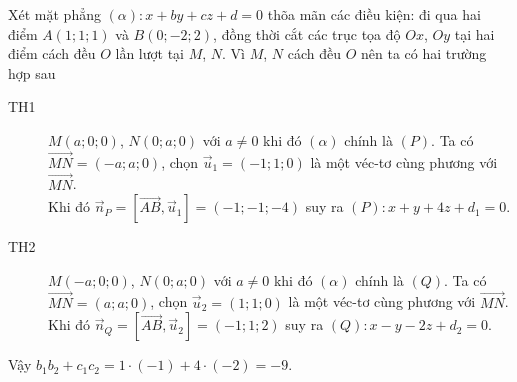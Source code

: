 \begin{ex}
{		Xét mặt phẳng $\left(\alpha\right) \colon x+by+cz+d=0$ thõa mãn các điều kiện: đi qua hai điểm $A \left(1;1;1\right)$ và $B\left(0;-2;2\right)$, đồng thời cắt các trục tọa độ $Ox$, $Oy$ tại hai điểm cách đều $O$ lần lượt tại $M$, $N$. Vì $M$, $N$ cách đều $O$ nên ta có hai trường hợp sau
		\begin{description}
			\item[TH1] $M \left(a;0;0\right)$, $N \left(0;a;0\right)$ với $a \neq 0$ khi đó $\left(\alpha\right)$ chính là $\left(P\right)$. Ta có $\overrightarrow{MN} = \left(-a;a;0\right)$, chọn $\overrightarrow{u}_1 = \left(-1;1;0\right)$ là một véc-tơ cùng phương với $\overrightarrow{MN}$.\\
			Khi đó $\overrightarrow{n}_P = \left[\overrightarrow{AB},\overrightarrow{u}_1\right] = \left(-1;-1;-4\right)$
			suy ra $\left(P\right) \colon x+y+4z+d_1 = 0$.
			\item[TH2] $M \left(-a;0;0\right)$, $N \left(0;a;0\right)$ với $a \neq 0$ khi đó $\left(\alpha\right)$ chính là $\left(Q\right)$. Ta có $\overrightarrow{MN} = \left(a;a;0\right)$, chọn $\overrightarrow{u}_2 = \left(1;1;0\right)$ là một véc-tơ cùng phương với $\overrightarrow{MN}$.\\
			Khi đó $\overrightarrow{n}_Q = \left[\overrightarrow{AB},\overrightarrow{u}_2\right] = \left(-1;1;2\right)$
			suy ra $\left(Q\right) \colon x-y-2z+d_2 = 0$.
		\end{description}
		Vậy $b_1b_2 + c_1c_2 = 1 \cdot \left(-1\right) + 4 \cdot \left(-2\right) = -9$.
	}
\end{ex}
